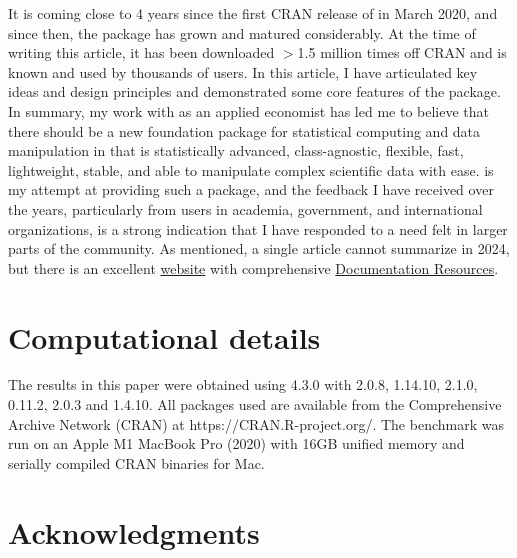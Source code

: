 \documentclass[article]{jss}
\begin{document}
It is coming close to 4 years since the first CRAN release of  in March 2020, and since then, the package has grown and matured considerably. At the time of writing this article, it has been downloaded $>$1.5 million times off CRAN and is known and used by thousands of  users. In this article, I have articulated key ideas and design principles and demonstrated some core features of the package. In summary, my work with  as an applied economist has led me to believe that there should be a new foundation package for statistical computing and data manipulation in  that is statistically advanced, class-agnostic, flexible, fast, lightweight, stable, and able to manipulate complex scientific data with ease.  is my attempt at providing such a package, and the feedback I have received over the years, particularly from users in academia, government, and international organizations, is a strong indication that I have responded to a need felt in larger parts of the  community. As mentioned, a single article cannot summarize  in 2024, but there is an excellent \href{https://sebkrantz.github.io/collapse/index.html}{website} with comprehensive \href{https://sebkrantz.github.io/collapse/articles/collapse_documentation.html}{Documentation Resources}.



\section*{Computational details}
The results in this paper were obtained using  \citep{R} 4.3.0 with  2.0.8,  1.14.10,  2.1.0,  0.11.2,  \citep{rmagrittr} 2.0.3 and  \citep{rmicrobenchmark} 1.4.10. All packages used are available from the Comprehensive  Archive Network (CRAN) at https://CRAN.R-project.org/. The benchmark was run on an Apple M1 MacBook Pro (2020) with 16GB unified memory and serially compiled CRAN binaries for Mac.

\section*{Acknowledgments}
\end{document}
